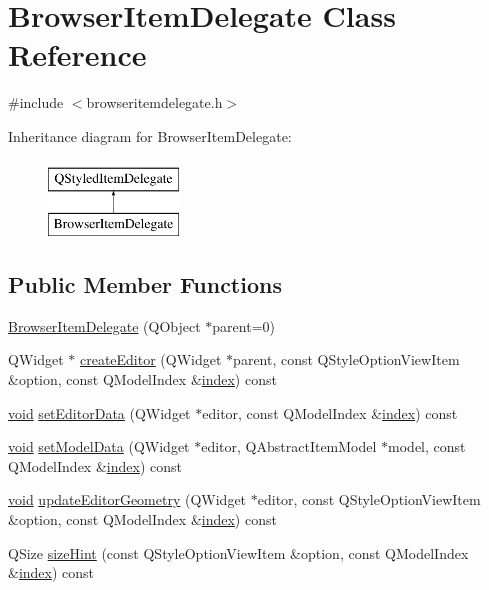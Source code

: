 \hypertarget{class_browser_item_delegate}{\section{Browser\-Item\-Delegate Class Reference}
\label{class_browser_item_delegate}
}


{\ttfamily \#include $<$browseritemdelegate.\-h$>$}

Inheritance diagram for Browser\-Item\-Delegate\-:\begin{figure}[H]
\begin{center}
\leavevmode
\includegraphics[height=2.000000cm]{class_browser_item_delegate}
\end{center}
\end{figure}
\subsection*{Public Member Functions}
\begin{DoxyCompactItemize}
\item 
\hyperlink{group___u_a_v_object_browser_plugin_gacfb0653f39791c3fb6b7b59ce4de990c}{Browser\-Item\-Delegate} (Q\-Object $\ast$parent=0)
\item 
Q\-Widget $\ast$ \hyperlink{group___u_a_v_object_browser_plugin_ga16c2a6f63557c8fe5ade68a4b8f43009}{create\-Editor} (Q\-Widget $\ast$parent, const Q\-Style\-Option\-View\-Item \&option, const Q\-Model\-Index \&\hyperlink{glext_8h_ab47dd9958bcadea08866b42bf358e95e}{index}) const 
\item 
\hyperlink{group___u_a_v_objects_plugin_ga444cf2ff3f0ecbe028adce838d373f5c}{void} \hyperlink{group___u_a_v_object_browser_plugin_ga07845c2f048ab9c2344102bbfb627b01}{set\-Editor\-Data} (Q\-Widget $\ast$editor, const Q\-Model\-Index \&\hyperlink{glext_8h_ab47dd9958bcadea08866b42bf358e95e}{index}) const 
\item 
\hyperlink{group___u_a_v_objects_plugin_ga444cf2ff3f0ecbe028adce838d373f5c}{void} \hyperlink{group___u_a_v_object_browser_plugin_ga14d19cdeeb41b7891318f803d87fa585}{set\-Model\-Data} (Q\-Widget $\ast$editor, Q\-Abstract\-Item\-Model $\ast$model, const Q\-Model\-Index \&\hyperlink{glext_8h_ab47dd9958bcadea08866b42bf358e95e}{index}) const 
\item 
\hyperlink{group___u_a_v_objects_plugin_ga444cf2ff3f0ecbe028adce838d373f5c}{void} \hyperlink{group___u_a_v_object_browser_plugin_gaf2e600876c101b4bf562057c6aeeade1}{update\-Editor\-Geometry} (Q\-Widget $\ast$editor, const Q\-Style\-Option\-View\-Item \&option, const Q\-Model\-Index \&\hyperlink{glext_8h_ab47dd9958bcadea08866b42bf358e95e}{index}) const 
\item 
Q\-Size \hyperlink{group___u_a_v_object_browser_plugin_gaed46b06e0a245805247c1be3c62f97ee}{size\-Hint} (const Q\-Style\-Option\-View\-Item \&option, const Q\-Model\-Index \&\hyperlink{glext_8h_ab47dd9958bcadea08866b42bf358e95e}{index}) const 
\end{DoxyCompactItemize}


